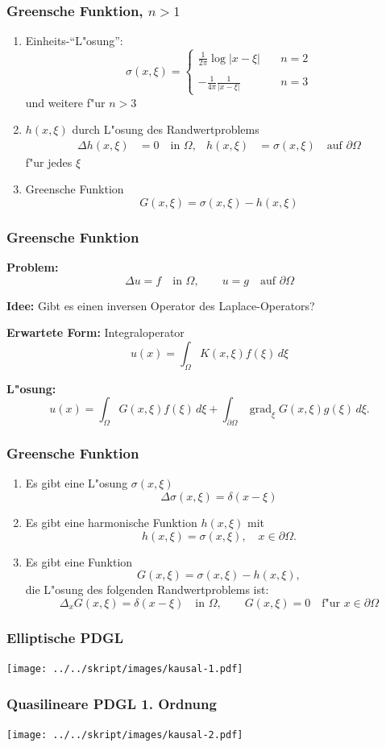 \begin{frame}
\frametitle{Greensche Funktion, $n>1$}
\begin{enumerate}[<+->]
\item
Einheits-``L"osung'':
\[
\sigma(x,\xi) = \begin{cases}
\displaystyle\frac1{2\pi}\log|x-\xi|\quad&n=2\\
\\
\displaystyle-\frac1{4\pi}\frac{1}{|x-\xi|}\quad&n=3
\end{cases}
\]
und weitere f"ur $n>3$
\item
$h(x,\xi)$ durch L"osung des Randwertproblems
\begin{align*}
\Delta h(x,\xi)&= 0\quad\text{in $\Omega$},&h(x,\xi)&=\sigma(x,\xi)\quad\text{auf $\partial\Omega$}
\end{align*}
f"ur jedes $\xi$
\item Greensche Funktion
\[
G(x,\xi)=\sigma(x,\xi)-h(x,\xi)
\]
\end{enumerate}
\end{frame}


\begin{frame}
\frametitle{Greensche Funktion}
{\bf Problem:}
\[
\Delta u=f\quad\text{in $\Omega$},\qquad u=g\quad\text{auf $\partial\Omega$}
\]
\medskip

{\bf Idee:} Gibt es einen inversen Operator des Laplace-Operators?
\medskip

\pause
{\bf Erwartete Form:} Integraloperator
\[
u(x)=\int_\Omega K(x,\xi)f(\xi)\,d\xi
\]

\pause
{\bf L"osung:}
\[
u(x)
=
\int_{\Omega} G(x,\xi)f(\xi)\,d\xi
+
\int_{\partial\Omega}  \operatorname{grad}_\xi G(x,\xi) g(\xi)\,d\xi.
\]

\end{frame}

\begin{frame}
\frametitle{Greensche Funktion}

\begin{enumerate}[<+->]
\item
Es gibt eine L"osung $\sigma(x,\xi)$
\[
\Delta \sigma (x,\xi)=\delta(x-\xi)
\]
\item 
Es gibt eine harmonische Funktion $h(x,\xi)$ mit
\[
h(x,\xi)=\sigma(x,\xi),\quad x\in\partial\Omega.
\]
\item
Es gibt eine Funktion
\[
G(x,\xi) = \sigma(x,\xi)-h(x,\xi),
\]
die L"osung des folgenden Randwertproblems ist:
\[
\Delta_x G(x,\xi) = \delta(x-\xi)\quad\text{in $\Omega$},
\qquad
G(x,\xi)=0\quad\text{f"ur $x\in\partial\Omega$}
\]
\end{enumerate}
\end{frame}

\begin{frame}
\frametitle{Elliptische PDGL}
\begin{center}
\texttt{[image: ../../skript/images/kausal-1.pdf]}
\end{center}
\end{frame}

\begin{frame}
\frametitle{Quasilineare PDGL 1. Ordnung}
\begin{center}
\texttt{[image: ../../skript/images/kausal-2.pdf]}
\end{center}
\end{frame}

